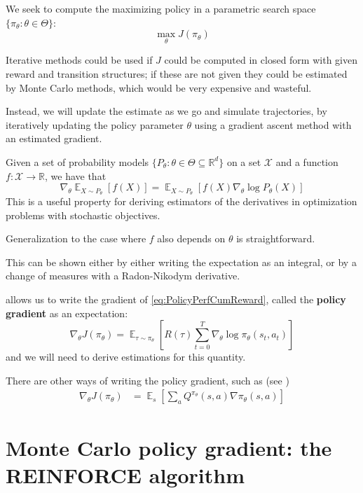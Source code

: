 \documentclass[12pt]{report}
\newcommand\RR{\mathbb{R}}
\DeclareMathOperator{\EE}{\mathbb{E}}
\newcommand{\calX}{\mathcal{X}}
\newcommand{\bluefont}{\color{Blue}}
\begin{document}
We seek to compute the maximizing policy in a parametric search space $\{\pi_\theta: \theta\in\Theta\}$:
\[
	\max_\theta J(\pi_\theta)
\]

Iterative methods could be used if $J$ could be computed in closed form with given reward and transition structures; if these are not given they could be estimated by Monte Carlo methods, which would be very expensive and wasteful.

Instead, we will update the estimate as we go and simulate trajectories, by iteratively updating the policy parameter $\theta$ using a gradient ascent method with an estimated gradient.

\begin{prop}\label{prop:parametricGradient}
	Given a set of probability models $\{P_\theta: \theta\in\Theta\subseteq \RR^d\}$ on a set $\calX$ and a function $f\colon \calX\to \RR$, we have that
	\[
	\nabla_\theta \EE_{X\sim P_\theta}[f(X)]
	= \EE_{X\sim P_\theta}[f(X)\nabla_\theta \log P_\theta(X)]
	\]
	This is a useful property for deriving estimators of the derivatives in optimization problems with stochastic objectives.
	
	Generalization to the case where $f$ also depends on $\theta$ is straightforward.
\end{prop}

This can be shown either by either writing the expectation as an integral, or by a change of measures with a Radon-Nikodym derivative.

 allows us to write the gradient of \eqref{eq:PolicyPerfCumReward}, called the \textbf{\bluefont policy gradient} as an expectation:
\begin{equation}\label{eq:PolicyGradient}
	\nabla_\theta J(\pi_\theta) =
	\EE_{\tau\sim\pi_\theta}\left[
	R(\tau)\sum_{t=0}^T\nabla_\theta \log\pi_\theta(s_t, a_t)
	\right]
\end{equation}
and we will need to derive estimations for this quantity.

There are other ways of writing the policy gradient, such as (see \cite[][chap.\ 13]{Sutton1998})
\begin{align*}
	\nabla_\theta J(\pi_\theta)
	&=
	\EE_s\left[
	\sum_a Q^{\pi_\theta}(s,a) \nabla\pi_\theta(s,a)
	\right]
\end{align*}




\section{Monte Carlo policy gradient: the REINFORCE algorithm}
\end{document}
